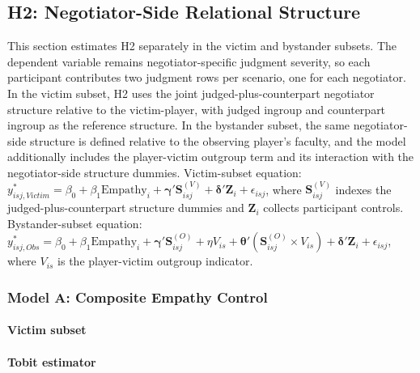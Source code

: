 \documentclass[11pt]{article}
\begin{document}
\subsection{H2: Negotiator-Side Relational Structure}
This section estimates H2 separately in the victim and bystander subsets. The dependent variable remains negotiator-specific judgment severity, so each participant contributes two judgment rows per scenario, one for each negotiator. In the victim subset, H2 uses the joint judged-plus-counterpart negotiator structure relative to the victim-player, with judged ingroup and counterpart ingroup as the reference structure. In the bystander subset, the same negotiator-side structure is defined relative to the observing player's faculty, and the model additionally includes the player-victim outgroup term and its interaction with the negotiator-side structure dummies.
Victim-subset equation: $y^*_{isj,Victim} = \beta_0 + \beta_1 \text{Empathy}_i + \boldsymbol{\gamma}' \mathbf{S}^{(V)}_{isj} + \boldsymbol{\delta}' \mathbf{Z}_i + \epsilon_{isj}$, where $\mathbf{S}^{(V)}_{isj}$ indexes the judged-plus-counterpart structure dummies and $\mathbf{Z}_i$ collects participant controls.
Bystander-subset equation: $y^*_{isj,Obs} = \beta_0 + \beta_1 \text{Empathy}_i + \boldsymbol{\gamma}' \mathbf{S}^{(O)}_{isj} + \eta V_{is} + \boldsymbol{\theta}' (\mathbf{S}^{(O)}_{isj} \times V_{is}) + \boldsymbol{\delta}' \mathbf{Z}_i + \epsilon_{isj}$, where $V_{is}$ is the player-victim outgroup indicator.
\subsubsection{Model A: Composite Empathy Control}
\paragraph{Victim subset}

\paragraph{Tobit estimator}
\end{document}
